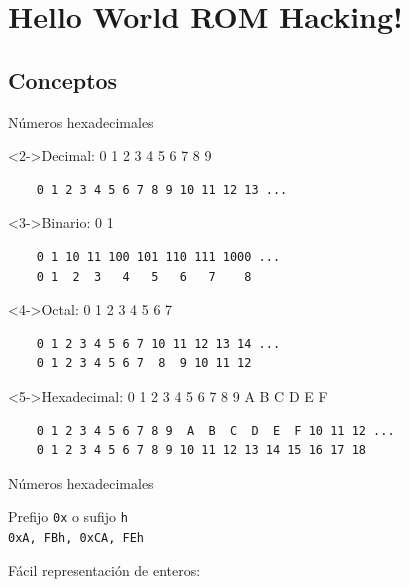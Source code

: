 \section{Hello World ROM Hacking!}
\subsection{Conceptos}
\begin{frame}[fragile]{Números hexadecimales}
    \begin{uncoverenv}<2->Decimal: 0 1 2 3 4 5 6 7 8 9
    \begin{lstlisting}
    0 1 2 3 4 5 6 7 8 9 10 11 12 13 ...\end{lstlisting}\end{uncoverenv}

    \begin{uncoverenv}<3->Binario: 0 1
    \begin{lstlisting}
    0 1 10 11 100 101 110 111 1000 ...
    0 1  2  3   4   5   6   7    8\end{lstlisting}\end{uncoverenv}

    \begin{uncoverenv}<4->Octal: 0 1 2 3 4 5 6 7
    \begin{lstlisting}
    0 1 2 3 4 5 6 7 10 11 12 13 14 ...
    0 1 2 3 4 5 6 7  8  9 10 11 12\end{lstlisting}\end{uncoverenv}

    \begin{uncoverenv}<5->Hexadecimal: 0 1 2 3 4 5 6 7 8 9 A B C D E F
    \begin{lstlisting}
    0 1 2 3 4 5 6 7 8 9  A  B  C  D  E  F 10 11 12 ...
    0 1 2 3 4 5 6 7 8 9 10 11 12 13 14 15 16 17 18\end{lstlisting}\end{uncoverenv}
\end{frame}

\begin{frame}[fragile]{Números hexadecimales}
    \begin{wideitemize}
        \item<1-> Prefijo \texttt{0x} o sufijo \texttt{h} \\
        \texttt{0xA, FBh, 0xCA, FEh}

        \item<2-> Fácil representación de enteros:
    \end{wideitemize}
\end{frame}

